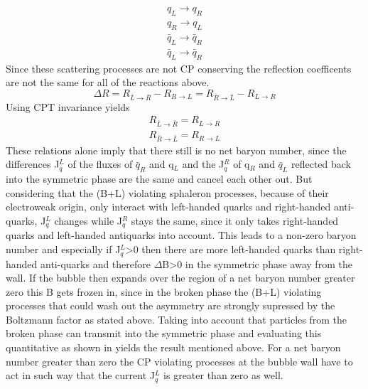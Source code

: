 \begin{align*}
	q_L\rightarrow q_R\\
	q_R\rightarrow q_L\\
	\bar{q}_L\rightarrow \bar{q}_R\\
	\bar{q}_L\rightarrow \bar{q}_R
\end{align*}
Since these scattering processes are not CP conserving the reflection coefficents are not the same for all of the reactions above.
\begin{equation}
	\Delta R=R_{\bar{L}\rightarrow\bar{R}}-R_{R\rightarrow L}=R_{\bar{R}\rightarrow\bar{L}}-R_{L\rightarrow R}
	\label{reflection_coeff}
\end{equation}
Using CPT invariance yields
\begin{align}
	R_{\bar{L}\rightarrow\bar{R}}=R_{L\rightarrow R}\\
	R_{\bar{R}\rightarrow\bar{L}}=R_{R\rightarrow L}
\end{align}
These relations alone imply that there still is no net baryon number, since the differences J$^L_q$ of the fluxes of $\bar{q}_R$ and q$_L$ and the  J$^R_q$ of q$_R$ and $\bar{q}_L$ reflected back into the symmetric phase are the same and cancel each other out. But considering that the (B+L) violating sphaleron processes, because of their electroweak origin, only interact with left-handed quarks and right-handed anti-quarks, J$^L_q$ changes while  J$^R_q$ stays the same, since it only takes right-handed quarks and left-handed antiquarks into account. This leads to a non-zero baryon number and especially if  J$^L_q$>0 then there are more left-handed quarks than right-handed anti-quarks and therefore $\Delta$B>0 in the symmetric phase away from the wall. If the bubble then expands over the region of a net baryon number greater zero this B gets frozen in, since in the broken phase the (B+L) violating processes that could wash out the asymmetry are strongly supressed by the Boltzmann factor as stated above. \newline
Taking into account that particles from the broken phase can transmit into the symmetric phase and evaluating this quantitative as shown in \cite[pp. 36-37]{Bernreuther:2002uj} yields the result mentioned above. For a net baryon number greater than zero the CP violating processes at the bubble wall have to act in such way that the current J$^L_q$ is greater than zero as well. 
